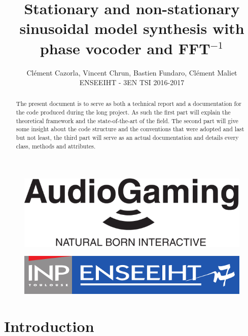 \documentclass[]{article}
\title{Stationary and non-stationary sinusoidal model synthesis with phase vocoder and FFT$^{-1}$}
\author{Cl\'ement Cazorla, Vincent Chrun, Bastien Fundaro, Cl\'ement Maliet \\ENSEEIHT - 3EN TSI 2016-2017}
\begin{document}
\maketitle

\begin{abstract}
The present document is to serve as both a technical report and a documentation for the code produced during the long project. As such the first part will explain the theoretical framework and the state-of-the-art of the field. The second part will give some insight about the code structure and the conventions that were adopted and last but not least, the third part will serve as an actual documentation and details every class, methods and attributes.
\end{abstract}
 \vspace{5cm}
	\begin{figure}[H]
		\centering
		\includegraphics[scale=0.28]{ag.png}
	\end{figure}
	\begin{figure}[H]
		\centering
		\includegraphics[scale=0.28]{enseeiht.png}
	\end{figure}

\newpage
\tableofcontents


\newpage
\part{Introduction}\label{sec:introduction}
\end{document}
